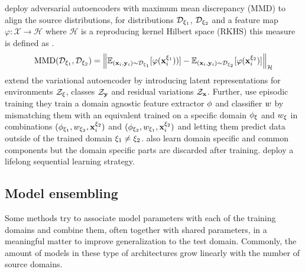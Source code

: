 \citet{LiPWK18} deploy adversarial autoencoders with maximum mean discrepancy (MMD) \citep{GrettonBRSS12} to align the source distributions, \ie for distributions $\mathcal{D}_{\xi_1}$, $\mathcal{D}_{\xi_2}$ and a feature map $\varphi: \mathcal{X} \rightarrow \mathcal{H}$ where $\mathcal{H}$ is a reproducing kernel Hilbert space (RKHS) this measure is defined as .
\begin{equation}
\label{eq:mmd}
    \operatorname{MMD}(\mathcal{D}_{\xi_1}, \mathcal{D}_{\xi_2})=\left\|\mathbb{E}_{(\mathbf{x}_i, \mathbf{y}_i) \sim \mathcal{D}_{\xi_1}}[\varphi(\mathbf{x}_i^{\xi_1}))]-\mathbb{E}_{(\mathbf{x}_i, \mathbf{y}_i) \sim \mathcal{D}_{\xi_2}}[\varphi(\mathbf{x}_i^{\xi_2})]\right\|_{\mathcal{H}}
\end{equation}
\citet{ilse2019diva} extend the variational autoencoder \citep{KingmaW13} by introducing latent representations for environments $\mathcal{Z}_\xi$, classes $\mathcal{Z}_{\mathbf{y}}$ and residual variations $\mathcal{Z}_{\mathbf{x}}$. Further, \citet{LiZYLSH19} use episodic training \ie they train a domain agnostic feature extractor $\phi$ and classifier $w$ by mismatching them with an equivalent trained on a specific domain $\phi_\xi$ and $w_\xi$ in combinations $(\phi_{\xi_1}, w_{\xi_2}, \mathbf{x}^{\xi_2}_i)$ and $(\phi_{\xi_2}, w_{\xi_1}, \mathbf{x}^{\xi_2}_i)$ and letting them predict data outside of the trained domain $\xi_1 \neq \xi_2$. \citet{piratla2020efficient} also learn domain specific and common components but the domain specific parts are discarded after training. \citet{li2020sequential} deploy a lifelong sequential learning strategy.

\subsection{Model ensembling}
\label{sec:model_ensembling}

Some methods try to associate model parameters with each of the training domains and combine them, often together with shared parameters, in a meaningful matter to improve generalization to the test domain. Commonly, the amount of models in these type of architectures grow linearly with the number of source domains. 

